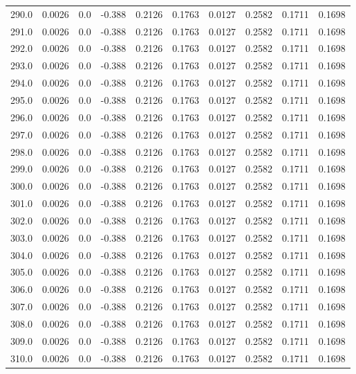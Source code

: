 \begin{longtable}{lrrrrrrrrr}
290.0 & 0.0026 & 0.0 & -0.388 & 0.2126 & 0.1763 & 0.0127 & 0.2582 & 0.1711 & 0.1698 \\
291.0 & 0.0026 & 0.0 & -0.388 & 0.2126 & 0.1763 & 0.0127 & 0.2582 & 0.1711 & 0.1698 \\
292.0 & 0.0026 & 0.0 & -0.388 & 0.2126 & 0.1763 & 0.0127 & 0.2582 & 0.1711 & 0.1698 \\
293.0 & 0.0026 & 0.0 & -0.388 & 0.2126 & 0.1763 & 0.0127 & 0.2582 & 0.1711 & 0.1698 \\
294.0 & 0.0026 & 0.0 & -0.388 & 0.2126 & 0.1763 & 0.0127 & 0.2582 & 0.1711 & 0.1698 \\
295.0 & 0.0026 & 0.0 & -0.388 & 0.2126 & 0.1763 & 0.0127 & 0.2582 & 0.1711 & 0.1698 \\
296.0 & 0.0026 & 0.0 & -0.388 & 0.2126 & 0.1763 & 0.0127 & 0.2582 & 0.1711 & 0.1698 \\
297.0 & 0.0026 & 0.0 & -0.388 & 0.2126 & 0.1763 & 0.0127 & 0.2582 & 0.1711 & 0.1698 \\
298.0 & 0.0026 & 0.0 & -0.388 & 0.2126 & 0.1763 & 0.0127 & 0.2582 & 0.1711 & 0.1698 \\
299.0 & 0.0026 & 0.0 & -0.388 & 0.2126 & 0.1763 & 0.0127 & 0.2582 & 0.1711 & 0.1698 \\
300.0 & 0.0026 & 0.0 & -0.388 & 0.2126 & 0.1763 & 0.0127 & 0.2582 & 0.1711 & 0.1698 \\
301.0 & 0.0026 & 0.0 & -0.388 & 0.2126 & 0.1763 & 0.0127 & 0.2582 & 0.1711 & 0.1698 \\
302.0 & 0.0026 & 0.0 & -0.388 & 0.2126 & 0.1763 & 0.0127 & 0.2582 & 0.1711 & 0.1698 \\
303.0 & 0.0026 & 0.0 & -0.388 & 0.2126 & 0.1763 & 0.0127 & 0.2582 & 0.1711 & 0.1698 \\
304.0 & 0.0026 & 0.0 & -0.388 & 0.2126 & 0.1763 & 0.0127 & 0.2582 & 0.1711 & 0.1698 \\
305.0 & 0.0026 & 0.0 & -0.388 & 0.2126 & 0.1763 & 0.0127 & 0.2582 & 0.1711 & 0.1698 \\
306.0 & 0.0026 & 0.0 & -0.388 & 0.2126 & 0.1763 & 0.0127 & 0.2582 & 0.1711 & 0.1698 \\
307.0 & 0.0026 & 0.0 & -0.388 & 0.2126 & 0.1763 & 0.0127 & 0.2582 & 0.1711 & 0.1698 \\
308.0 & 0.0026 & 0.0 & -0.388 & 0.2126 & 0.1763 & 0.0127 & 0.2582 & 0.1711 & 0.1698 \\
309.0 & 0.0026 & 0.0 & -0.388 & 0.2126 & 0.1763 & 0.0127 & 0.2582 & 0.1711 & 0.1698 \\
310.0 & 0.0026 & 0.0 & -0.388 & 0.2126 & 0.1763 & 0.0127 & 0.2582 & 0.1711 & 0.1698 \\

\end{longtable}
